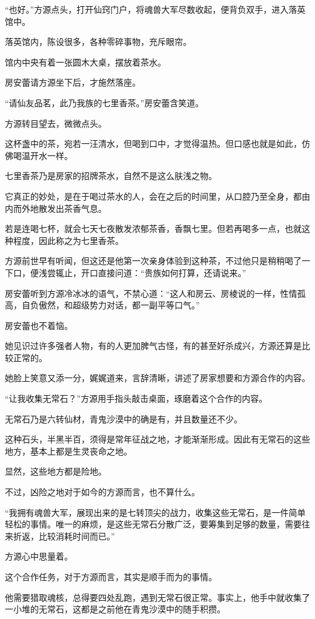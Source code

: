 \begin{this_body}
“也好。”方源点头，打开仙窍门户，将魂兽大军尽数收起，便背负双手，进入落英馆中。

落英馆内，陈设很多，各种零碎事物，充斥眼帘。

馆内中央有着一张圆木大桌，摆放着茶水。

房安蕾请方源坐下后，才施然落座。

“请仙友品茗，此乃我族的七里香茶。”房安蕾含笑道。

方源转目望去，微微点头。

这杯盏中的茶，宛若一汪清水，但喝到口中，才觉得温热。但口感也就是如此，仿佛喝温开水一样。

七里香茶乃是房家的招牌茶水，自然不是这么肤浅之物。

它真正的妙处，是在于喝过茶水的人，会在之后的时间里，从口腔乃至全身，都由内而外地散发出茶香气息。

若是连喝七杯，就会七天七夜散发浓郁茶香，香飘七里。但若再喝多一点，也就这种程度，因此称之为七里香茶。

方源前世早有听闻，但这还是他第一次亲身体验到这种茶，不过他只是稍稍喝了一下口，便浅尝辄止，开口直接问道：“贵族如何打算，还请说来。”

房安蕾听到方源冷冰冰的语气，不禁心道：“这人和房云、房棱说的一样，性情孤高，自负傲然，和超级势力对话，都一副平等口气。”

房安蕾也不着恼。

她见识过许多强者人物，有的人更加脾气古怪，有的甚至好杀成兴，方源还算是比较正常的。

她脸上笑意又添一分，娓娓道来，言辞清晰，讲述了房家想要和方源合作的内容。

“让我收集无常石？”方源用手指头敲击桌面，琢磨着这个合作的内容。

无常石乃是六转仙材，青鬼沙漠中的确是有，并且数量还不少。

这种石头，半黑半百，须得是常年征战之地，才能渐渐形成。因此有无常石的这些地方，基本上都是生灵丧命之地。

显然，这些地方都是险地。

不过，凶险之地对于如今的方源而言，也不算什么。

“我拥有魂兽大军，展现出来的是七转顶尖的战力，收集这些无常石，是一件简单轻松的事情。唯一的麻烦，是这些无常石分散广泛，要筹集到足够的数量，需要往来折返，比较消耗时间而已。”

方源心中思量着。

这个合作任务，对于方源而言，其实是顺手而为的事情。

他需要猎取魂核，总得要四处乱跑，遇到无常石很正常。事实上，他手中就收集了一小堆的无常石，这都是之前他在青鬼沙漠中的随手积攒。


\end{this_body}
